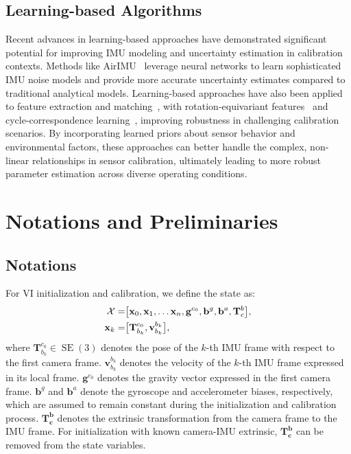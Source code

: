 \subsection{Learning-based Algorithms}
Recent advances in learning-based approaches have demonstrated significant potential for improving IMU modeling and uncertainty estimation in calibration contexts.
Methods like AirIMU~\cite{qiu2023airimu} leverage neural networks to learn sophisticated IMU noise models and provide more accurate uncertainty estimates compared to traditional analytical models.
Learning-based approaches have also been applied to feature extraction and matching~\cite{lee2024lpl}, with rotation-equivariant features~\cite{lee2023rotation} and cycle-correspondence learning~\cite{adrian2024cycle}, improving robustness in challenging calibration scenarios.
By incorporating learned priors about sensor behavior and environmental factors, these approaches can better handle the complex, non-linear relationships in sensor calibration, ultimately leading to more robust parameter estimation across diverse operating conditions.


\section{Notations and Preliminaries}
\label{sec:maci2:preliminaries}

\subsection{Notations}
For VI initialization and calibration, we define the state as:
\begin{align}
\label{eq:maci2:state}
\mathcal {X}=&\big [ \mathbf {x}_{0},\mathbf {x}_{1},\ldots \mathbf {x}_{n}, \mathbf{g}^{c_{0}}, \mathbf{b}^g, \mathbf{b}^a, \mathbf {T}^{b}_{c} \big ] \notag, \\ \mathbf {x}_{k}=&\big [ \mathbf {T}^{c_{0}}_{b_{k}},\mathbf {v}^{b_{k}}_{b_{k}} \big ],
\end{align}
where $\mathbf{T}^{c_0}_{b_k} \in \operatorname{SE}(3)$ denotes the pose of the $k$-th IMU frame with respect to the first camera frame. $\mathbf{v}^{b_k}_{b_k}$ denotes the velocity of the $k$-th IMU frame expressed in its local frame. $\mathbf{g}^{c_0}$ denotes the gravity vector expressed in the first camera frame. $\mathbf{b}^g$ and $\mathbf{b}^a$ denote the gyroscope and accelerometer biases, respectively, which are assumed to remain constant during the initialization and calibration process. $\mathbf{T^b_c}$ denotes the extrinsic transformation from the camera frame to the IMU frame. For initialization with known camera-IMU extrinsic, $\mathbf{{T}^{b}_{c}}$ can be removed from the state variables.

